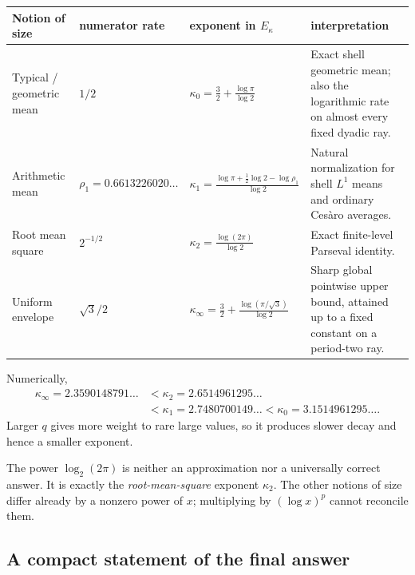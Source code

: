 \documentclass[11pt,oneside]{article}
\numberwithin{equation}{section}
\theoremstyle{definition}
\theoremstyle{remark}
\begin{document}
\begin{center}
\small
\begin{tabularx}{\textwidth}{@{}>{\raggedright\arraybackslash}p{}
 >{\centering\arraybackslash}p{}
 >{\centering\arraybackslash}p{}X@{}}
\toprule
Notion of size & numerator rate & exponent in \(E_\kappa\) & interpretation\\
\midrule
Typical / geometric mean
 & \(1/2\)
 & \(\displaystyle\kappa_0=\frac32+\frac{\log\pi}{\log2}\)
 & Exact shell geometric mean; also the logarithmic rate on almost every fixed dyadic ray.\\[0.55em]
Arithmetic mean
 & \(\rho_1=0.6613226020\ldots\)
 & \(\displaystyle\kappa_1=\frac{\log\pi+\frac12\log2-\log\rho_1}{\log2}\)
 & Natural normalization for shell \(L^1\) means and ordinary Ces\`aro averages.\\[0.55em]
Root mean square
 & \(2^{-1/2}\)
 & \(\displaystyle\kappa_2=\frac{\log(2\pi)}{\log2}\)
 & Exact finite-level Parseval identity.\\[0.55em]
Uniform envelope
 & \(\sqrt3/2\)
 & \(\displaystyle\kappa_\infty=\frac32+\frac{\log(\pi/\sqrt3)}{\log2}\)
 & Sharp global pointwise upper bound, attained up to a fixed constant on a period-two ray.\\
\bottomrule
\end{tabularx}
\end{center}

Numerically,
\begin{equation}
 \begin{aligned}
 \kappa_\infty=2.3590148791\ldots
 &<\kappa_2=2.6514961295\ldots\\
 &<\kappa_1=2.7480700149\ldots
 <\kappa_0=3.1514961295\ldots .
 \end{aligned}
 \label{eq:kappa-order-intro}
\end{equation}
Larger \(q\) gives more weight to rare large values, so it produces slower decay and hence
a smaller exponent.

\begin{pitfallbox}
The power \(\log_2(2\pi)\) is neither an approximation nor a universally correct answer.
It is exactly the \emph{root-mean-square} exponent \(\kappa_2\).  The other notions of size
differ already by a nonzero power of \(x\); multiplying by \((\log x)^p\) cannot reconcile
them.
\end{pitfallbox}

\subsection{A compact statement of the final answer}
\end{document}
